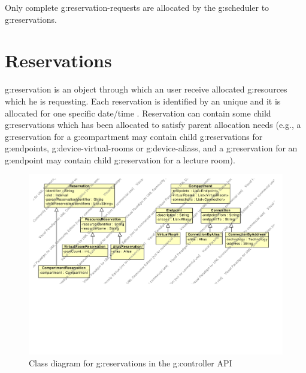 Only complete \glspl{g:reservation-request} are allocated by the \gls{g:scheduler} to \glspl{g:reservation}.


\section{Reservations}

\Gls{g:reservation} is an object through which an user receive allocated \glspl{g:resource} which he is requesting. Each reservation is identified by an unique  and it is allocated for one specific date/time . Reservation can contain some child \glspl{g:reservation} which has been allocated to satisfy parent allocation needs (e.g., a \gls{g:reservation} for a \gls{g:compartment} may contain child \glspl{g:reservation} for \glspl{g:endpoint}, \glspl{g:device-virtual-room} or \glspl{g:device-alias}, and a \gls{g:reservation} for an \gls{g:endpoint} may contain child \gls{g:reservation} for a lecture room).

\begin{figure}[ht!]
\includegraphics[width=\textwidth]{diagrams/cd_api_reservations}
\caption{Class diagram for \glspl{g:reservation} in the \gls{g:controller} API}
\label{fig:cd_api_reservations}
\end{figure}

